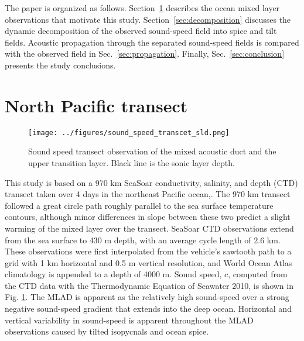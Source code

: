 \documentclass[preprint,NumberedRefs]{JASA}
\begin{document}
The paper is organized as follows. Section~\ref{sec:transcet} describes the ocean mixed layer observations that motivate this study. Section~\ref{sec:decomposition} discusses the dynamic decomposition of the observed sound-speed field into spice and tilt fields. Acoustic propagation through the separated sound-speed fields is compared with the observed field in Sec.~\ref{sec:propagation}. Finally, Sec.~\ref{sec:conclusion} presents the study conclusions.

\section{North Pacific transect}\label{sec:transcet}
\begin{figure}
\texttt{[image: ../figures/sound\_speed\_transcet\_sld.png]}
\caption{\label{fig:c_grid}{Sound speed transect observation of the mixed acoustic duct and the upper transition layer. Black line is the sonic layer depth.}}
\end{figure}

This study is based on a 970 km SeaSoar conductivity, salinity, and depth (CTD) transect taken over 4 days in the northeast Pacific ocean,\citep{cole2010seasonal, colosi2020observations}. The 970 km transect followed a great circle path roughly parallel to the sea surface temperature contours, although minor differences in slope between these two predict a slight warming of the mixed layer over the transect. SeaSoar CTD observations extend from the sea surface to 430 m depth, with an average cycle length of 2.6 km. These observations were first interpolated from the vehicle's sawtooth path to a grid with 1 km horizontal and 0.5 m vertical resolution\citep{colosi2020observations}, and World Ocean Atlas climatology is appended to a depth of 4000 m\citep{WOA}. Sound speed, $c$, computed from the CTD data with the Thermodynamic Equation of Seawater 2010,\cite{TEOS10} is shown in Fig. \ref{fig:c_grid}. The MLAD is apparent as the relatively high sound-speed over a strong negative sound-speed gradient that extends into the deep ocean. Horizontal and vertical variability in sound-speed is apparent throughout the MLAD observations caused by tilted isopycnals and ocean spice\citep{colosi2020observations}.
\end{document}
